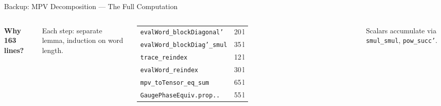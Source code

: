 \documentclass[aspectratio=169,10pt]{beamer}
\begin{document}
\begin{frame}[fragile]{Backup: MPV Decomposition --- The Full Computation}
\begin{columns}[T]
{\small\textbf{Why 163 lines?}}\\[0.05em]
{\scriptsize Each step: separate lemma, induction on word length.

\vspace{0.05em}
\renewcommand{\arraystretch}{0.95}
\begin{tabular}{lr}
\texttt{evalWord\_blockDiagonal'} & 20\,l \\
\texttt{evalWord\_blockDiag'\_smul} & 35\,l \\
\texttt{trace\_reindex} & 12\,l \\
\texttt{evalWord\_reindex} & 30\,l \\
\texttt{mpv\_toTensor\_eq\_sum} & 65\,l \\
\texttt{GaugePhaseEquiv.prop..} & 55\,l \\
\end{tabular}

\vspace{0.05em}
Scalars accumulate via \texttt{smul\_smul}, \texttt{pow\_succ'}.}
\end{columns}
\end{frame}
\end{document}
